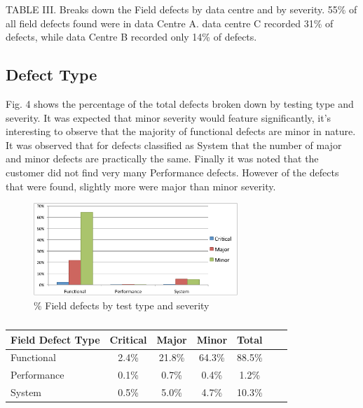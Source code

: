 \documentclass[conference]{IEEEtran}
\begin{document}
TABLE III. Breaks down the Field defects by data centre and by severity.  55\% of all field defects found were in data Centre A. data centre C recorded 31\% of defects, while data Centre B recorded only 14\% of defects. 

\subsection{Defect Type}

Fig. 4 shows the percentage of the total defects broken down by testing type and severity. It was expected that minor severity would feature significantly, it's interesting to observe that the majority of functional defects are minor in nature. It was observed that for defects classified as System that the number of major and minor defects are practically the same. Finally it was noted that the customer did not find very many Performance defects. However of the defects that were found, slightly more were major than minor severity.

\begin{figure}
\begin{center}
\includegraphics[height=3.5cm]{graphs/graph4.pdf} 
\caption{\% Field defects by test type and severity}
\end{center}
\label{fig:defecttesttype}
\end{figure}

\begin {table}
\caption {}
\begin{center}
\begin{tabular}{l*{5}{c}r} Field Defect Type & Critical & Major & Minor &  Total \\ \hline Functional & 2.4\%	 & 21.8\%	& 64.3\%	& 88.5\% \\ Performance & 0.1\% & 0.7\% & 0.4\% & 1.2\% \\ System & 0.5\% & 5.0\% & 4.7\% & 10.3\%   \end{tabular}
\end{center}
\end{table}
\end{document}
